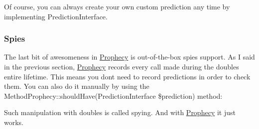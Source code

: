 Of course, you can always create your own custom prediction any time by implementing {\ttfamily Prediction\+Interface}.

\subsubsection*{Spies}

The last bit of awesomeness in \mbox{\hyperlink{namespace_prophecy}{Prophecy}} is out-\/of-\/the-\/box spies support. As I said in the previous section, \mbox{\hyperlink{namespace_prophecy}{Prophecy}} records every call made during the double\textquotesingle{}s entire lifetime. This means you don\textquotesingle{}t need to record predictions in order to check them. You can also do it manually by using the {\ttfamily Method\+Prophecy\+::should\+Have(Prediction\+Interface \$prediction)} method\+:




Such manipulation with doubles is called spying. And with \mbox{\hyperlink{namespace_prophecy}{Prophecy}} it just works. 